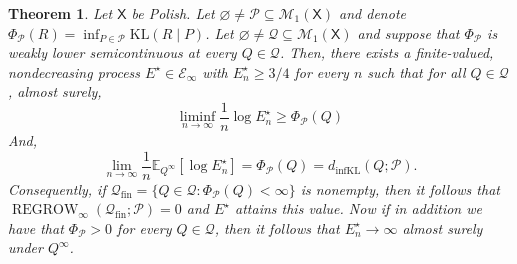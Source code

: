 \documentclass[10pt,a4paper]{amsart}
\newtheorem{theorem}{Theorem}
\newcommand{\E}{\mathbb{E}}
\newcommand{\KL}{\mathrm{KL}}
\newcommand{\Pcal}{\mathcal{P}}
\newcommand{\Qcal}{\mathcal{Q}}
\newcommand{\REGROW}{\operatorname{REGROW}}
\newcommand{\X}{\mathsf{X}}
\newcommand{\dinfKL}{d_{\mathrm{infKL}}}
\begin{document}
\begin{theorem}\label{regrow-localweaklsc}
Let $\X$ be Polish. Let $\varnothing\ne \Pcal\subseteq\mathcal M_1(\X)$ and denote $\Phi_{\Pcal}(R)=\inf_{P\in\Pcal}\KL(R\mid P)$. Let $\varnothing\ne \Qcal\subseteq \mathcal M_1(\X)$ and suppose that $\Phi_{\Pcal}$ is weakly lower semicontinuous at every $Q\in\Qcal$. Then, there exists a finite-valued, nondecreasing process $E^{\star}\in\mathcal E_{\infty}$ with $E_n^{\star}\ge 3/4$ for every $n$ such that for all $Q\in\Qcal$, almost surely,
\[
\liminf_{n\to\infty}\frac1n\log E_n^\star\ge \Phi_{\Pcal}(Q)
\]
And,
\[
\lim_{n\to\infty}\frac1n \E_{Q^{\infty}}[\log E_n^{\star}]=\Phi_{\Pcal}(Q)=\dinfKL(Q;\Pcal).
\]
Consequently, if $\Qcal_{\mathrm{fin}}=\{Q\in\Qcal:\Phi_{\Pcal}(Q)<\infty\}$ is nonempty, then it follows that $\REGROW_{\infty}(\Qcal_{\mathrm{fin}}; \Pcal)=0$ and $E^{\star}$ attains this value. Now if in addition we have that $\Phi_{\Pcal}>0$ for every $Q\in\Qcal$, then it follows that $E_n^{\star}\rightarrow \infty$ almost surely under $Q^{\infty}$. 
\end{theorem}
\end{document}
